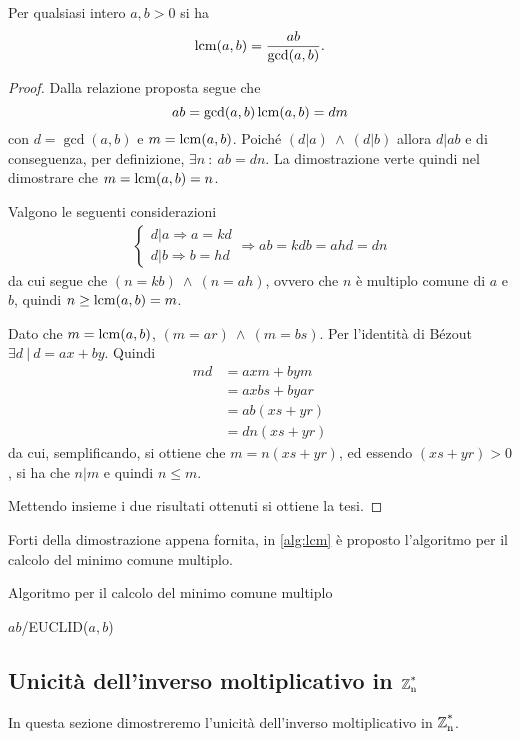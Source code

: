 \begin{proposizione}
Per qualsiasi intero $a,b>0$ si ha
\[
\operatorname*{lcm}(a,b)=\frac{ab}{\gcd(a,b)}.
\]
\end{proposizione}
\begin{proof}
Dalla relazione proposta segue che
\[ab=\gcd(a,b)\operatorname*{lcm}(a,b)=dm
\]
con $d=\gcd(a,b)$ e $m=\operatorname*{lcm}(a,b)$. Poiché $(d|a)\ \land\ (d|b)$ allora $d|ab$ e di conseguenza, per definizione, $\exists n\ :\ ab=dn$. La dimostrazione verte quindi nel dimostrare che $m=\operatorname*{lcm}(a,b)=n$.

Valgono le seguenti considerazioni
\begin{align*}
\begin{cases}
d|a \Rightarrow a=kd \\
d|b \Rightarrow b=hd
\end{cases}
\Rightarrow ab=kdb=ahd=dn
\end{align*}
da cui segue che $(n=kb)\ \land\ (n=ah)$, ovvero che $n$ è multiplo comune di $a$ e $b$, quindi $n\geq \operatorname*{lcm}(a,b)=m$.

Dato che $m=\operatorname*{lcm}(a,b)$, $(m=ar)\ \land\ (m=bs)$. Per l'identità di Bézout $\exists d\ |\ d=ax+by$. Quindi
\begin{align*}
md&=axm+bym \\
&=axbs+byar \\
&=ab(xs+yr) \\
&=dn(xs+yr)
\end{align*}
da cui, semplificando, si ottiene che $m=n(xs+yr)$, ed essendo $(xs+yr)>0$, si ha che $n|m$ e quindi $n\leq m$.

Mettendo insieme i due risultati ottenuti si ottiene la tesi.
\end{proof}

Forti della dimostrazione appena fornita, in \ref{alg:lcm} è proposto l'algoritmo per il calcolo del minimo comune multiplo.

\begin{algorithm}
\caption{Algoritmo per il calcolo del minimo comune multiplo}
\label{alg:lcm}
\begin{algorithmic}
   \State \Return $ab$/EUCLID($a,b$)
\EndFunction
\end{algorithmic}
\end{algorithm}

\subsection{Unicità dell'inverso moltiplicativo in $\operatorname*{\mathbb{Z}_n^*}$}
In questa sezione dimostreremo l'unicità dell'inverso moltiplicativo in $\operatorname*{\mathbb{Z}_n^*}$.

